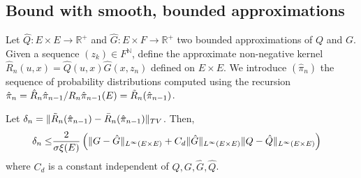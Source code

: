 \subsection{Bound with smooth, bounded approximations}

Let $\hat Q : E \times E\to\mathbb R^+$ and $\hat G: E \times F \to \mathbb R^+$ two bounded approximations of $Q$ and $G$. Given a sequence $(z_k)\in F^\mathbb N$, define the approximate non-negative kernel $\hat R_n(u, x) = \hat Q(u, x)\hat G(x, z_n)$ defined on $E\times E$. We introduce $(\hat\pi_n)$ the sequence of probability distributions computed using the recursion $\hat \pi_{n} = \hat R_n\hat\pi_{n-1}/R_n\hat\pi_{n-1}(E)=\tilde{{R}}_n(\hat\pi_{n-1})$.

\begin{proposition}\label{prop:bound-delta-n}
Let $\delta_n = \Vert \tilde{{R}}_n(\hat\pi_{n-1}) - \bar R_n(\hat\pi_{n-1})\Vert_{TV}$. Then,
\begin{align}
    \delta_n \leq & \frac{2}{\sigma\xi(E)}\left(\Vert G-\hat G\Vert_{L^\infty(E\times E)} + C_d\Vert \hat G\Vert_{L^\infty(E\times E)}\Vert Q-\hat Q\Vert_{L^\infty(E\times E)}\right)
\end{align}
where $C_d$ is a constant independent of $Q, G,\hat G, \hat Q$.
\end{proposition}

